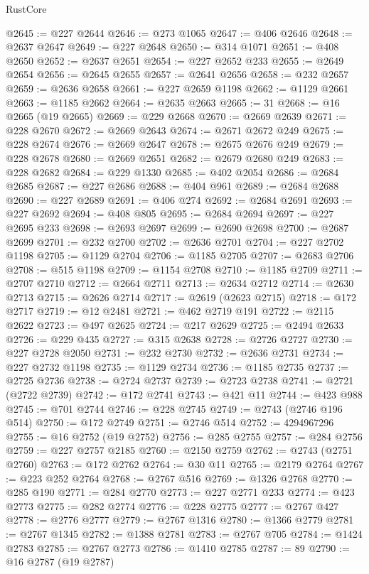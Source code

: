 \begin{lexlean}{RustCore}
\begin{coremodule}
@2645 := @227 @2644
@2646 := @273 @1065
@2647 := @406 @2646
@2648 := @2637 @2647
@2649 := @227 @2648
@2650 := @314 @1071
@2651 := @408 @2650
@2652 := @2637 @2651
@2654 := @227 @2652 @233
@2655 := @2649 @2654
@2656 := @2645 @2655
@2657 := @2641 @2656
@2658 := @232 @2657
@2659 := @2636 @2658
@2661 := @227 @2659 @1198
@2662 := @1129 @2661
@2663 := @1185 @2662
@2664 := @2635 @2663
@2665 := 31
@2668 := @16 @2665 (@19 @2665)
@2669 := @229 @2668
@2670 := @2669 @2639
@2671 := @228 @2670
@2672 := @2669 @2643
@2674 := @2671 @2672 @249
@2675 := @228 @2674
@2676 := @2669 @2647
@2678 := @2675 @2676 @249
@2679 := @228 @2678
@2680 := @2669 @2651
@2682 := @2679 @2680 @249
@2683 := @228 @2682
@2684 := @229 @1330
@2685 := @402 @2054
@2686 := @2684 @2685
@2687 := @227 @2686
@2688 := @404 @961
@2689 := @2684 @2688
@2690 := @227 @2689
@2691 := @406 @274
@2692 := @2684 @2691
@2693 := @227 @2692
@2694 := @408 @805
@2695 := @2684 @2694
@2697 := @227 @2695 @233
@2698 := @2693 @2697
@2699 := @2690 @2698
@2700 := @2687 @2699
@2701 := @232 @2700
@2702 := @2636 @2701
@2704 := @227 @2702 @1198
@2705 := @1129 @2704
@2706 := @1185 @2705
@2707 := @2683 @2706
@2708 := @515 @1198
@2709 := @1154 @2708
@2710 := @1185 @2709
@2711 := @2707 @2710
@2712 := @2664 @2711
@2713 := @2634 @2712
@2714 := @2630 @2713
@2715 := @2626 @2714
@2717 := @2619 (@2623 @2715)
@2718 := @172 @2717
@2719 := @12 @2481
@2721 := @462 @2719 @191
@2722 := @2115 @2622
@2723 := @497 @2625
@2724 := @217 @2629
@2725 := @2494 @2633
@2726 := @229 @435
@2727 := @315 @2638
@2728 := @2726 @2727
@2730 := @227 @2728 @2050
@2731 := @232 @2730
@2732 := @2636 @2731
@2734 := @227 @2732 @1198
@2735 := @1129 @2734
@2736 := @1185 @2735
@2737 := @2725 @2736
@2738 := @2724 @2737
@2739 := @2723 @2738
@2741 := @2721 (@2722 @2739)
@2742 := @172 @2741
@2743 := @421 @11
@2744 := @423 @988
@2745 := @701 @2744
@2746 := @228 @2745
@2749 := @2743 (@2746 @196 @514)
@2750 := @172 @2749
@2751 := @2746 @514
@2752 := 4294967296
@2755 := @16 @2752 (@19 @2752)
@2756 := @285 @2755
@2757 := @284 @2756
@2759 := @227 @2757 @2185
@2760 := @2150 @2759
@2762 := @2743 (@2751 @2760)
@2763 := @172 @2762
@2764 := @30 @11
@2765 := @2179 @2764
@2767 := @223 @252 @2764
@2768 := @2767 @516
@2769 := @1326 @2768
@2770 := @285 @190
@2771 := @284 @2770
@2773 := @227 @2771 @233
@2774 := @423 @2773
@2775 := @282 @2774
@2776 := @228 @2775
@2777 := @2767 @427
@2778 := @2776 @2777
@2779 := @2767 @1316
@2780 := @1366 @2779
@2781 := @2767 @1345
@2782 := @1388 @2781
@2783 := @2767 @705
@2784 := @1424 @2783
@2785 := @2767 @2773
@2786 := @1410 @2785
@2787 := 89
@2790 := @16 @2787 (@19 @2787)

\end{coremodule}
\end{lexlean}
